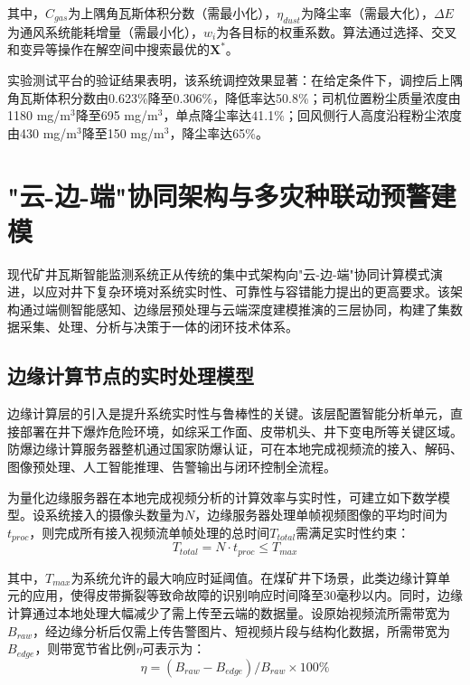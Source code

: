 \documentclass[twocolumn,a4paper]{ctexart}
\numberwithin{equation}{section}
\begin{document}
其中，$C_{gas}$为上隅角瓦斯体积分数（需最小化），$\eta_{dust}$为降尘率（需最大化），$\Delta E$为通风系统能耗增量（需最小化），$w_i$为各目标的权重系数。算法通过选择、交叉和变异等操作在解空间中搜索最优的$\bm{X}^*$。

实验测试平台的验证结果表明，该系统调控效果显著：在给定条件下，调控后上隅角瓦斯体积分数由0.623\%降至0.306\%，降低率达50.8\%；司机位置粉尘质量浓度由1180 mg/m$^3$降至695 mg/m$^3$，单点降尘率达41.1\%；回风侧行人高度沿程粉尘浓度由430 mg/m$^3$降至150 mg/m$^3$，降尘率达65\%。

\section{"云-边-端"协同架构与多灾种联动预警建模}

现代矿井瓦斯智能监测系统正从传统的集中式架构向"云-边-端"协同计算模式演进，以应对井下复杂环境对系统实时性、可靠性与容错能力提出的更高要求。该架构通过端侧智能感知、边缘层预处理与云端深度建模推演的三层协同，构建了集数据采集、处理、分析与决策于一体的闭环技术体系。

\subsection{边缘计算节点的实时处理模型}

边缘计算层的引入是提升系统实时性与鲁棒性的关键。该层配置智能分析单元，直接部署在井下爆炸危险环境，如综采工作面、皮带机头、井下变电所等关键区域。防爆边缘计算服务器整机通过国家防爆认证，可在本地完成视频流的接入、解码、图像预处理、人工智能推理、告警输出与闭环控制全流程。

为量化边缘服务器在本地完成视频分析的计算效率与实时性，可建立如下数学模型。设系统接入的摄像头数量为$N$，边缘服务器处理单帧视频图像的平均时间为$t_{proc}$，则完成所有接入视频流单帧处理的总时间$T_{total}$需满足实时性约束：
\begin{equation}
T_{total} = N \cdot t_{proc} \leq T_{max}
\end{equation}

其中，$T_{max}$为系统允许的最大响应时延阈值。在煤矿井下场景，此类边缘计算单元的应用，使得皮带撕裂等致命故障的识别响应时间降至30毫秒以内。同时，边缘计算通过本地处理大幅减少了需上传至云端的数据量。设原始视频流所需带宽为$B_{raw}$，经边缘分析后仅需上传告警图片、短视频片段与结构化数据，所需带宽为$B_{edge}$，则带宽节省比例$\eta$可表示为：
\begin{equation}
\eta = (B_{raw} - B_{edge}) / B_{raw} \times 100\%
\end{equation}
\end{document}

